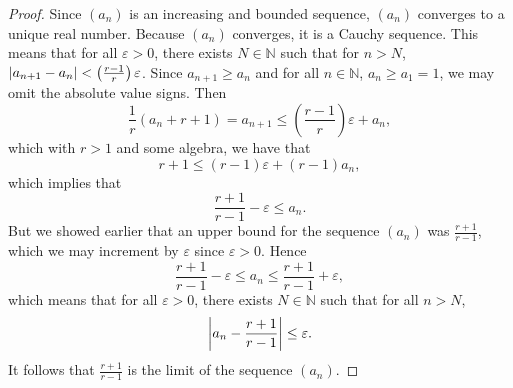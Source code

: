 \documentclass[12pt]{amsart}
\begin{document}
\begin{proof}
    Since $(a_n)$ is an increasing and bounded sequence, $(a_n)$ converges to a unique real number. Because $(a_n)$ converges, it is a Cauchy sequence. This means that for all $\varepsilon>0$, there exists $N\in\mathbb{N}$ such that for $n>N$, $\abs{a_{n+1} - a_n} < \left(\frac{r-1}{r}\right)\varepsilon$. Since $a_{n+1} \geq a_n$ and for all $n\in\mathbb{N}$, $a_n \geq a_1 = 1$, we may omit the absolute value signs. Then 
    \[ \frac{1}{r}(a_n+r+1) = a_{n+1} \leq \left(\frac{r-1}{r}\right)\varepsilon + a_n,\]
    which with $r>1$ and some algebra, we have that 
    \[r+1 \leq (r-1)\varepsilon + (r-1)a_n,\] which implies that
    \[\frac{r+1}{r-1} - \varepsilon \leq a_n.\]
    But we showed earlier that an upper bound for the sequence $(a_n)$ was $\frac{r+1}{r-1}$, which we may increment by $\varepsilon$ since $\varepsilon >0$. Hence \[\frac{r+1}{r-1} - \varepsilon \leq a_n\leq \frac{r+1}{r-1} + \varepsilon,\] which means that for all $\varepsilon>0$, there exists $N\in\mathbb{N}$ such that for all $n>N$, \[\abs{a_n-\frac{r+1}{r-1}} \leq \varepsilon.\] It follows that $\frac{r+1}{r-1}$ is the limit of the sequence $(a_n)$.
\end{proof}
\end{document}
